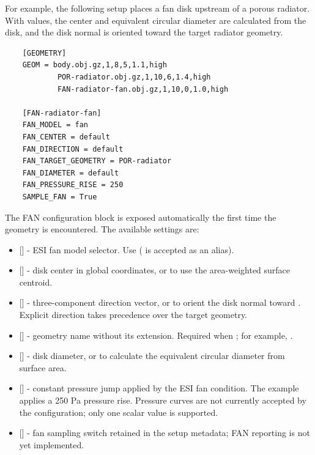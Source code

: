 For example, the following setup places a fan disk upstream of a porous radiator. With  values, the center and equivalent circular diameter are calculated from the disk, and the disk normal is oriented toward the target radiator geometry.

\begin{lstlisting}
    [GEOMETRY]
    GEOM = body.obj.gz,1,8,5,1.1,high
            POR-radiator.obj.gz,1,10,6,1.4,high
            FAN-radiator-fan.obj.gz,1,10,0,1.0,high

    [FAN-radiator-fan]
    FAN_MODEL = fan
    FAN_CENTER = default
    FAN_DIRECTION = default
    FAN_TARGET_GEOMETRY = POR-radiator
    FAN_DIAMETER = default
    FAN_PRESSURE_RISE = 250
    SAMPLE_FAN = True
\end{lstlisting}

The FAN configuration block is exposed automatically the first time the geometry is encountered. The available settings are:
\begin{itemize}
    \item {} [] - ESI fan model selector. Use  ( is accepted as an alias).
    \item {} [] - disk center in global coordinates, or  to use the area-weighted surface centroid.
    \item {} [] - three-component direction vector, or  to orient the disk normal toward . Explicit direction takes precedence over the target geometry.
    \item {} [] - geometry name without its extension. Required when ; for example, .
    \item {} [] - disk diameter, or  to calculate the equivalent circular diameter from surface area.
    \item {} [] - constant pressure jump applied by the ESI fan condition. The example applies a 250 Pa pressure rise. Pressure curves are not currently accepted by the  configuration; only one scalar value is supported.
    \item {} [] - fan sampling switch retained in the setup metadata; FAN reporting is not yet implemented.
\end{itemize}

